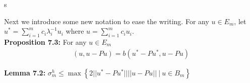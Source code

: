 s\documentclass[../../main.tex]{subfiles}
\begin{document}
Next we introduce some new notation to ease the writing. For any $u \in E_{m}$, let $u^{*} = \sum_{i=1}^{m} c_{i}\lambda_{i}^{-1}u_{i}$ where $u = \sum_{i=1}^{m} c_{i}u_{i}$.\\


\textbf{Proposition 7.3:} For any $u \in E_{m}$
\begin{eqnarray*}
( u, u - Pu ) = b(u^{*} - Pu^{*}, u -Pu)
\end{eqnarray*}

\begin{comment}
\textbf{Proof:} For any $i = 1,2,...,m$, we have that
\begin{eqnarray*}
\lambda_{i}( u_{i},u-Pu ) &=&  b(u_{i}, u-Pu)\\
									&=& b(u_{i}, u-Pu) - b(u-Pu,Pu_{i}) \ \textrm{ (by definition of Rayleigh-Ritz Projection)}\\
									&=&  b(u_{i}, u-Pu) - b(Pu_{i},u-Pu)\\
									&=&  b(u_{i}-Pu_{i}, u-Pu)
\end{eqnarray*}
So multiplying by $c_{i}\lambda_{i}^{-1}$ and summation over i gives:
\begin{eqnarray*}
\sum_{i=1}^{m} c_{i}\lambda_{i}^{-1}\lambda_{i}( u_{i},u-Pu ) &=& \sum_{i=1}^{m} c_{i}\lambda_{i}^{-1}b(u_{i}-Pu_{i}, u-Pu)\\
									&=& b(\sum_{i=1}^{m} c_{i}\lambda_{i}^{-1}u_{i}-\sum_{i=1}^{m} c_{i}\lambda_{i}^{-1}Pu_{i}, u-Pu)\\
									&=& b(u^{*}-Pu^{*}, u-Pu)
\end{eqnarray*}
So $( u,u-Pu ) = b(u^{*}-Pu^{*}, u-Pu)$.\qed\\
\end{comment}

\textbf{Lemma 7.2:} $\sigma_{m}^{h} \leq \max \left\{2||u^{*}- Pu^{*}|| ||u-Pu|| \ | \ u \in B_{m} \right\}$\\

\begin{comment}
\textbf{Proof:} From Proposition 7.1, we have
\begin{eqnarray*}
\sigma_{m}^{h} &=& \max\left\{ 2( u,u-Pu )-||u-Pu||^{2} \ | \ u \in B_{m} \right \} \\
				&\leq & \max\left\{ 2( u,u-Pu ) \ | \ u \in B_{m} \right \}
\end{eqnarray*} since $||u-Pu||^{2} \geq 0$.\\
\end{comment}
\end{document}
